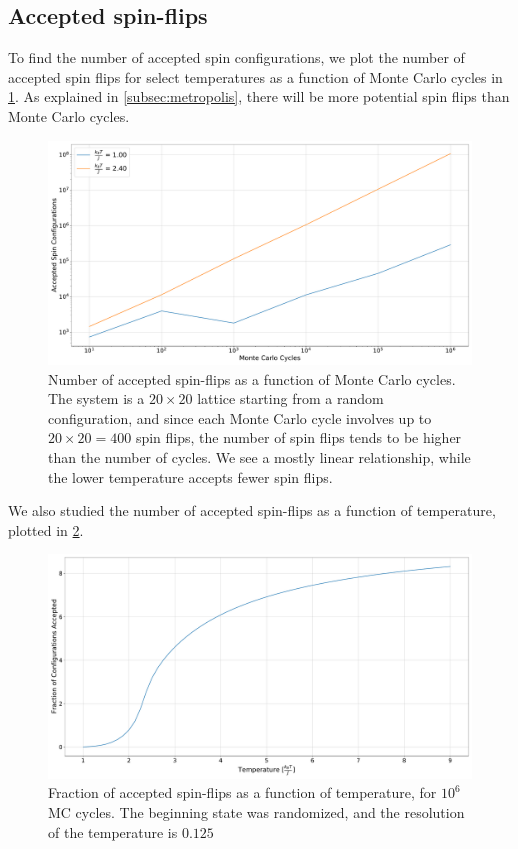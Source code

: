 \documentclass[../main.tex]{subfiles}
\begin{document}
\newpage

\subsection{Accepted spin-flips}
To find the number of accepted spin configurations, we plot the number of accepted spin flips for select temperatures as a function of Monte Carlo cycles in \cref{fig:spin-flips}. As explained in \cref{subsec:metropolis}, there will be more potential spin flips than Monte Carlo cycles. 

\begin{figure}[htb!]
    \centering
    \includegraphics[trim=0.cm 0.cm 0.cm 0.cm, clip,width=1.0\textwidth]{../figures/spin_flips_ising_20x20_1E6_cycles_T_1.0_2.4_rng_1.pdf}
    \caption{Number of accepted spin-flips as a function of Monte Carlo cycles. The system is a $20 \times 20$ lattice starting from a random configuration, and since each Monte Carlo cycle involves up to $20 \times 20 = 400$ spin flips, the number of spin flips tends to be higher than the number of cycles. We see a mostly linear relationship, while the lower temperature accepts fewer spin flips. }
    \label{fig:spin-flips}
\end{figure}

We also studied the number of accepted spin-flips as a function of temperature, plotted in \cref{fig:spin-flips-temp}. 

\begin{figure}[htb!]
    \centering
    \includegraphics[trim=0.cm 0.cm 0.cm 0.cm, clip,width=1.0\textwidth]{../figures/config_ising_20x20_1E6_cycles_T_1.0_9.0_rng_1.pdf}
    \caption{Fraction of accepted spin-flips as a function of temperature, for $10^6$ MC cycles. The beginning state was randomized, and the resolution of the temperature is $0.125$}
    \label{fig:spin-flips-temp}
\end{figure}
\end{document}

